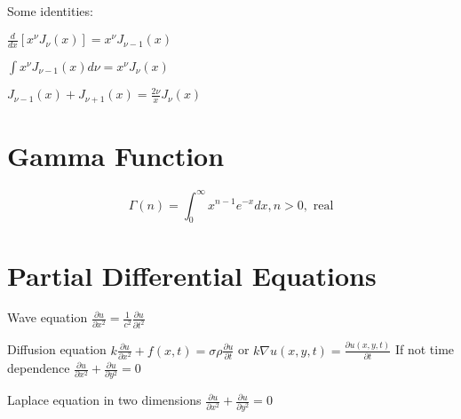 \documentclass[12pt,twoside]{article}
\begin{document}
Some identities:
\bi
	\item $\frac{d}{dx} [x^{\nu} J_{\nu}(x)] = x^\nu J_{\nu-1}(x)$
	\item $\int x^{\nu} J_{\nu-1}(x) d\nu = x^\nu J_{\nu}(x)$
	\item $J_{\nu-1}(x) + J_{\nu+1}(x) = \frac{2\nu}{x}J_\nu(x)$
\ei


\section{Gamma Function}

\[
	\Gamma(n) = \int_0^\infty x^{n-1} e^{-x} dx, n > 0, \text{ real}
\]

\section{Partial Differential Equations}

\bi
	\item Wave equation $\frac{\partial u}{\partial x^2} = \frac{1}{c^2} \frac{\partial u}{\partial t^2}$
	\item Diffusion equation $k \frac{\partial u}{\partial x^2} + f(x,t) = \sigma \rho  \frac{\partial u}{\partial t}$ or
	$k \nabla u (x,y,t) =\frac{\partial u(x,y,t)}{\partial t}$ 
	If not time dependence  $\frac{\partial u}{\partial x^2} + \frac{\partial u}{\partial y^2} = 0$
	\item Laplace equation in two dimensions $\frac{\partial u}{\partial x^2} + \frac{\partial u}{\partial y^2} = 0$
\ei
\end{document}
